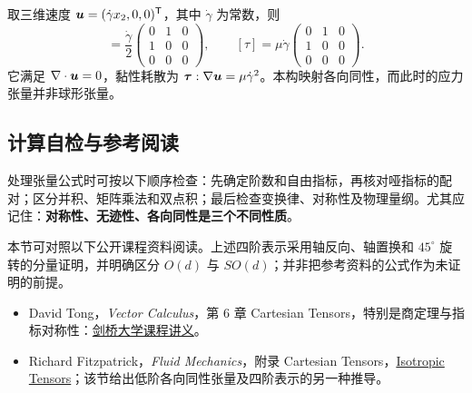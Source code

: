 \begin{example}
取三维速度 $\bm{u}=(\dot\gamma x_2,0,0)^{\mathsf T}$，其中 $\dot\gamma$ 为常数，则
\begin{equation}
 [D]=\frac{\dot\gamma}{2}
 \begin{pmatrix}0&1&0\\1&0&0\\0&0&0\end{pmatrix},\qquad
 [\tau]=\mu\dot\gamma
 \begin{pmatrix}0&1&0\\1&0&0\\0&0&0\end{pmatrix}.
\end{equation}
它满足 $\nabla\cdot\bm{u}=0$，黏性耗散为 $\bm{\tau}:\nabla\bm{u}=\mu\dot\gamma^2$。本构映射各向同性，而此时的应力张量并非球形张量。
\end{example}

\subsection{计算自检与参考阅读}

处理张量公式时可按以下顺序检查：先确定阶数和自由指标，再核对哑指标的配对；区分并积、矩阵乘法和双点积；最后检查变换律、对称性及物理量纲。尤其应记住：\textbf{对称性、无迹性、各向同性是三个不同性质}。

本节可对照以下公开课程资料阅读。上述四阶表示采用轴反向、轴置换和 $45^\circ$ 旋转的分量证明，并明确区分 $O(d)$ 与 $SO(d)$；并非把参考资料的公式作为未证明的前提。
\begin{itemize}
 \item David Tong，\emph{Vector Calculus}，第 6 章 Cartesian Tensors，特别是商定理与指标对称性：\href{https://www.damtp.cam.ac.uk/user/tong/vc/vc6.pdf}{剑桥大学课程讲义}。
 \item Richard Fitzpatrick，\emph{Fluid Mechanics}，附录 Cartesian Tensors，\href{https://farside.ph.utexas.edu/teaching/336L/Fluid/node252.html}{Isotropic Tensors}；该节给出低阶各向同性张量及四阶表示的另一种推导。
\end{itemize}
